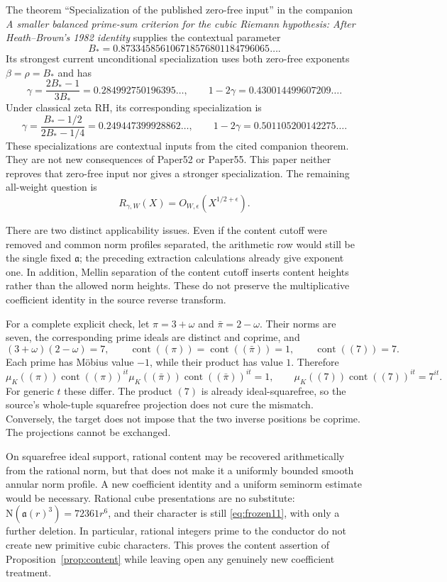 \documentclass[11pt]{article}
\theoremstyle{remark}\newtheorem{remark}[theorem]{Remark}
\newcommand{\N}{\mathrm N}
\DeclareMathOperator{\cont}{cont}
\begin{document}
The theorem ``Specialization of the published zero-free input'' in the companion \emph{A smaller balanced prime-sum criterion for the cubic Riemann hypothesis: After Heath--Brown's 1982 identity} \citep{jointcontent} supplies the contextual parameter
\[
B_*=0.873345856106718576801184796065\ldots.
\]
Its strongest current unconditional specialization uses both zero-free exponents $\beta=\rho=B_*$ and has
\[
\gamma=\frac{2B_*-1}{3B_*}=0.284992750196395\ldots,
\qquad1-2\gamma=0.430014499607209\ldots.
\]
Under classical zeta RH, its corresponding specialization is
\[
\gamma=\frac{B_*-1/2}{2B_*-1/4}=0.249447399928862\ldots,
\qquad1-2\gamma=0.501105200142275\ldots.
\]
These specializations are contextual inputs from the cited companion theorem. They are not new consequences of Paper52 or Paper55. This paper neither reproves that zero-free input nor gives a stronger specialization. The remaining all-weight question is
\[
R_{\gamma,W}(X)=O_{W,\epsilon}(X^{1/2+\epsilon}).
\]

There are two distinct applicability issues. Even if the content cutoff were removed and common norm profiles separated, the arithmetic row would still be the single fixed $\mathfrak a$; the preceding extraction calculations already give exponent one. In addition, Mellin separation of the content cutoff inserts content heights rather than the allowed norm heights. These do not preserve the multiplicative coefficient identity in the source reverse transform.

For a complete explicit check, let $\pi=3+\omega$ and $\bar\pi=2-\omega$. Their norms are seven, the corresponding prime ideals are distinct and coprime, and
\[
(3+\omega)(2-\omega)=7,
\qquad\cont((\pi))=\cont((\bar\pi))=1,
\qquad\cont((7))=7.
\]
Each prime has Möbius value $-1$, while their product has value $1$. Therefore
\[
\mu_K((\pi))\cont((\pi))^{it}
\mu_K((\bar\pi))\cont((\bar\pi))^{it}=1,
\qquad
\mu_K((7))\cont((7))^{it}=7^{it}.
\]
For generic $t$ these differ. The product $(7)$ is already ideal-squarefree, so the source's whole-tuple squarefree projection does not cure the mismatch. Conversely, the target does not impose that the two inverse positions be coprime. The projections cannot be exchanged.

On squarefree ideal support, rational content may be recovered arithmetically from the rational norm, but that does not make it a uniformly bounded smooth annular norm profile. A new coefficient identity and a uniform seminorm estimate would be necessary. Rational cube presentations are no substitute: $\N(\mathfrak a(r)^3)=72361r^6$, and their character is still \eqref{eq:frozen11}, with only a further deletion. In particular, rational integers prime to the conductor do not create new primitive cubic characters. This proves the content assertion of Proposition~\ref{prop:content} while leaving open any genuinely new coefficient treatment.
\end{document}
